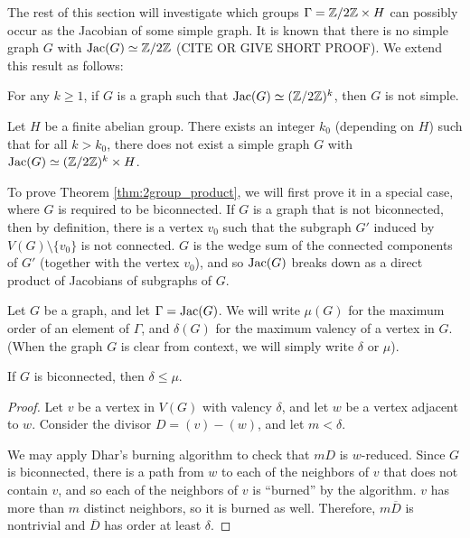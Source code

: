 \documentclass{amsart}
\begin{document}
The rest of this section will investigate which groups $\Gamma =
\mathbb{Z}/2\mathbb{Z} \times H$ can possibly occur as the Jacobian of some simple
graph. It is known that there is no simple graph $G$ with $\operatorname{Jac}(G)
\simeq \mathbb{Z}/2\mathbb{Z}$ (CITE OR GIVE SHORT PROOF). We extend this result as
follows:

\begin{thm}
  \label{thm:2group}
  For any $k \ge 1$, if $G$ is a graph such that $\operatorname{Jac}(G) \simeq
  (\mathbb{Z}/2\mathbb{Z})^k$, then $G$ is not simple.
\end{thm}

\begin{thm}
  \label{thm:2group_product}
  Let $H$ be a finite abelian group. There exists an integer $k_0$
  (depending on $H$) such that for all $k > k_0$, there does not exist
  a simple graph $G$ with $\operatorname{Jac}(G) \simeq (\mathbb{Z}/2\mathbb{Z})^k \times H$.
\end{thm}

To prove Theorem \ref{thm:2group_product}, we will first prove it in a
special case, where $G$ is required to be biconnected. If $G$ is a
graph that is not biconnected, then by definition, there is a vertex
$v_0$ such that the subgraph $G'$ induced by $V(G) \setminus \{v_0\}$
is not connected. $G$ is the wedge sum of the connected components of
$G'$ (together with the vertex $v_0$), and so $\operatorname{Jac}(G)$ breaks down as
a direct product of Jacobians of subgraphs of $G$.

\begin{defn}
  Let $G$ be a graph, and let $\Gamma = \operatorname{Jac}(G)$. We will write $\mu(G)$
  for the maximum order of an element of $\Gamma$, and $\delta(G)$ for
  the maximum valency of a vertex in $G$. (When the graph $G$ is clear
  from context, we will simply write $\delta$ or $\mu$). 
\end{defn}

\begin{lem}
  \label{lem:delta_le_mu}
  If $G$ is biconnected, then $\delta \le \mu$.
\end{lem}
\begin{proof}
  Let $v$ be a vertex in $V(G)$ with valency $\delta$, and let $w$ be
  a vertex adjacent to $w$. Consider the divisor $D = (v) -
  (w)$, and let $m < \delta$. 

  We may apply Dhar's burning algorithm to check that $mD$ is
  $w$-reduced. Since $G$ is biconnected, there is a path from $w$ to
  each of the neighbors of $v$ that does not contain $v$, and so each
  of the neighbors of $v$ is ``burned'' by the algorithm. $v$ has more
  than $m$ distinct neighbors, so it is burned as well. Therefore,
  $m\overline{D}$ is nontrivial and $\overline{D}$ has order at least
  $\delta$.
\end{proof}
\end{document}
